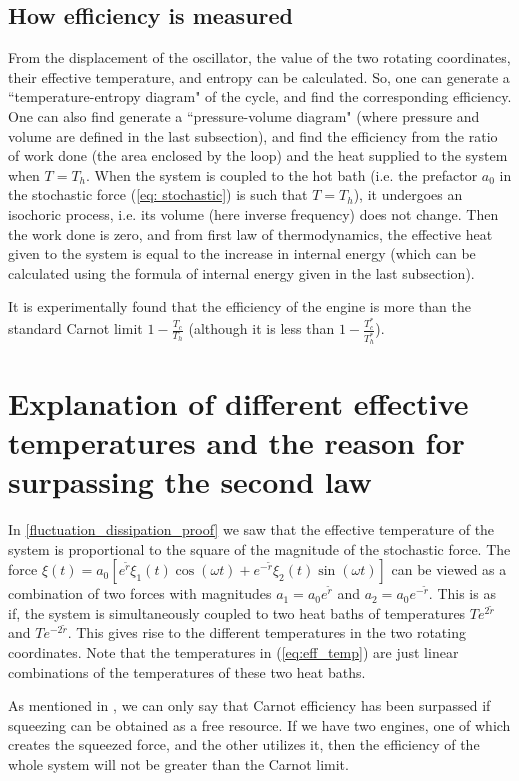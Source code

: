 \documentclass[12pt, twoside]{article}
\begin{document}
\subsection{How efficiency is measured}
From the displacement of the oscillator, the value of the two rotating coordinates, their effective temperature, and entropy can be calculated. So, one can generate a ``temperature-entropy diagram" of the cycle, and find the corresponding efficiency. One can also find generate a ``pressure-volume diagram" (where pressure and volume are defined in the last subsection), and find the efficiency from the ratio of work done (the area enclosed by the loop) and the heat supplied to the system when $T = T_h$. When the system is coupled to the hot bath (i.e. the prefactor $a_0$ in the stochastic force (\ref{eq: stochastic}) is such that $T = T_h$), it undergoes an isochoric process, i.e. its volume (here inverse frequency) does not change. Then the work done is zero, and from first law of thermodynamics, the effective heat given to the system is equal to the increase in internal energy (which can be calculated using the formula of internal energy given in the last subsection).

It is experimentally found that the efficiency of the engine is more than the standard Carnot limit $1 - \frac{T_c}{T_h}$ (although it is less than $1 - \frac{T^*_c}{T^* _h}$).

\section{Explanation of different effective temperatures and the reason for surpassing the second law}
In \ref{fluctuation_dissipation_proof} we saw that the effective temperature of the system is proportional to the square of the magnitude of the stochastic force. The force $\xi(t) =  a_0 [e^{\tilde{r}} \xi_1(t) \cos(\omega t) + e^{-{\tilde{r}}} \xi_2(t)\sin(\omega t)]$ can be viewed as a combination of two forces with magnitudes $a_1 = a_0 e^{\tilde{r}}$ and $a_2 = a_0 e^{-{\tilde{r}}}$. This is as if, the system is simultaneously coupled to two heat baths of temperatures $T e^{2{\tilde{r}}}$ and $T e^{-2{\tilde{r}}}$. This gives rise to the different temperatures in the two rotating coordinates. Note that the temperatures in (\ref{eq:eff_temp}) are just linear combinations of the temperatures of these two heat baths.

As mentioned in \cite{klaers}, we can only say that Carnot efficiency has been surpassed if squeezing can be obtained as a free resource. If we have two engines, one of which creates the squeezed force, and the other utilizes it, then the efficiency of the whole system will not be greater than the Carnot limit.
\end{document}
